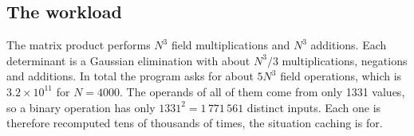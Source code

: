 \subsection{The workload}

The matrix product performs $N^3$ field multiplications and $N^3$ additions. Each
determinant is a Gaussian elimination with about $N^3/3$ multiplications, negations and
additions. In total the program asks for about $5N^3$ field operations, which is
$3.2 \times 10^{11}$ for $N = 4000$. The operands of all of them come from only 1331
values, so a binary operation has only $1331^2 = 1\,771\,561$ distinct inputs. Each one is
therefore recomputed tens of thousands of times, the situation caching is for.

